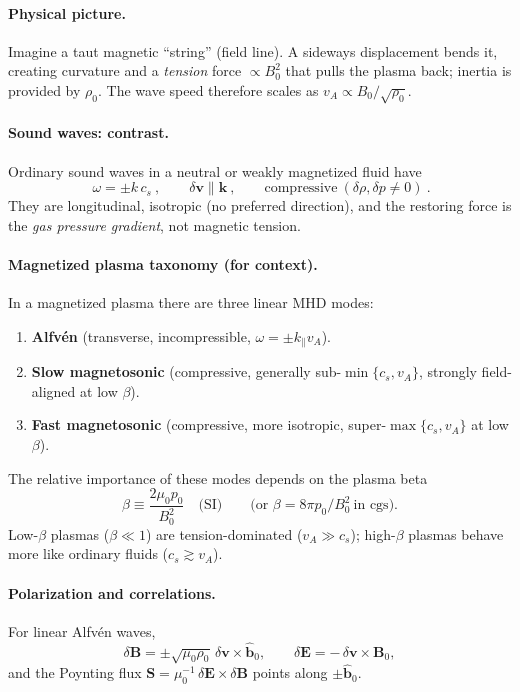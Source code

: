 \paragraph{Physical picture.}
Imagine a taut magnetic ``string'' (field line). A sideways displacement bends it, creating curvature and a \emph{tension} force $\propto B_0^2$ that pulls the plasma back; inertia is provided by $\rho_0$. The wave speed therefore scales as $v_A\propto B_0/\sqrt{\rho_0}$.

\paragraph{Sound waves: contrast.}
Ordinary sound waves in a neutral or weakly magnetized fluid have
\[
\boxed{\ \omega = \pm k\,c_s\ ,\qquad \delta\mathbf{v}\parallel \mathbf{k}\ ,\qquad \text{compressive}~(\delta\rho,\delta p\neq 0)\ }.
\]
They are longitudinal, isotropic (no preferred direction), and the restoring force is the \emph{gas pressure gradient}, not magnetic tension.

\paragraph{Magnetized plasma taxonomy (for context).}
In a magnetized plasma there are three linear MHD modes:
\begin{enumerate}
\item \textbf{Alfv\'en} (transverse, incompressible, $\omega=\pm k_\parallel v_A$).
\item \textbf{Slow magnetosonic} (compressive, generally sub-$\min\{c_s,v_A\}$, strongly field-aligned at low $\beta$).
\item \textbf{Fast magnetosonic} (compressive, more isotropic, super-$\max\{c_s,v_A\}$ at low $\beta$).
\end{enumerate}
The relative importance of these modes depends on the plasma beta
\[
\beta \equiv \frac{2\mu_0 p_0}{B_0^2} \quad \text{(SI)}\qquad \Big(\text{or } \beta=8\pi p_0/B_0^2\ \text{in cgs}\Big).
\]
Low-$\beta$ plasmas ($\beta\ll1$) are tension-dominated ($v_A\gg c_s$); high-$\beta$ plasmas behave more like ordinary fluids ($c_s\gtrsim v_A$).

\paragraph{Polarization and correlations.}
For linear Alfv\'en waves,
\[
\delta\mathbf{B} = \pm \sqrt{\mu_0 \rho_0}\,\delta\mathbf{v}\times \hat{\mathbf{b}}_0,\qquad
\delta\mathbf{E} = -\,\delta\mathbf{v}\times \mathbf{B}_0,
\]
and the Poynting flux $\mathbf{S}=\mu_0^{-1}\,\delta\mathbf{E}\times \delta\mathbf{B}$ points along $\pm\hat{\mathbf{b}}_0$.


